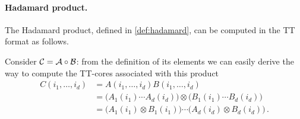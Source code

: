 \paragraph{Hadamard product.} The Hadamard product, defined in \eqref{def:hadamard}, can be computed in the TT format as follows.

Consider $\mathcal{C} = \mathcal{A} \circ \mathcal{B}$: from the definition of its elements we can easily derive the way to compute the TT-cores associated with this product
\begin{equation*}
  \begin{split}
    C(i_1,\ldots,i_d) &= A(i_1,\ldots,i_d) B(i_1,\ldots,i_d)\\
    &= \Big( A_1(i_1) \cdots A_d(i_d) \Big) \otimes \Big( B_1(i_1) \cdots B_d(i_d) \Big) \\
    &= \Big( A_1(i_1) \otimes B_1(i_1) \Big) \cdots \Big( A_d(i_d) \otimes B_d(i_d) \Big)\, .
  \end{split}
\end{equation*}

